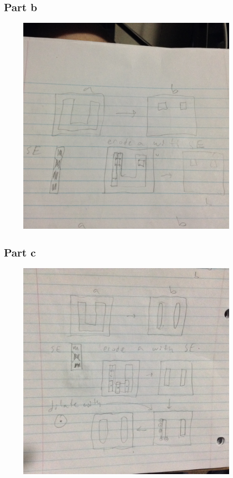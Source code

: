 \documentclass{article}
\begin{document}
	\subsection{Part b}
	\begin{figure}[H]
		\includegraphics[width=\linewidth]{9.5/fig2.JPG}
	\end{figure}
	\subsection{Part c}
	\begin{figure}[H]
		\includegraphics[width=\linewidth]{9.5/fig3.JPG}
	\end{figure}
\end{document}
